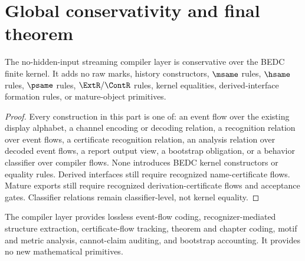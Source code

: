\section{Global conservativity and final theorem}
\label{sec:main-theorems-global-conservativity-final}

\begin{theorem}
\label{thm:main-theorems-global-conservativity}
The no-hidden-input streaming compiler layer is conservative over the BEDC finite kernel. It adds no raw marks, history constructors, $\msame$ rules, $\hsame$ rules, $\psame$ rules, $\ExtR/\ContR$ rules, kernel equalities, derived-interface formation rules, or mature-object primitives.
\end{theorem}

\begin{proof}
Every construction in this part is one of: an event flow over the existing display alphabet, a channel encoding or decoding relation, a recognition relation over event flows, a certificate recognition relation, an analysis relation over decoded event flows, a report output view, a bootstrap obligation, or a behavior classifier over compiler flows. None introduces BEDC kernel constructors or equality rules. Derived interfaces still require recognized name-certificate flows. Mature exports still require recognized derivation-certificate flows and acceptance gates. Classifier relations remain classifier-level, not kernel equality.
\end{proof}

\begin{corollary}
\label{cor:main-theorems-address-analysis-layer}
The compiler layer provides lossless event-flow coding, recognizer-mediated structure extraction, certificate-flow tracking, theorem and chapter coding, motif and metric analysis, cannot-claim auditing, and bootstrap accounting. It provides no new mathematical primitives.
\end{corollary}

